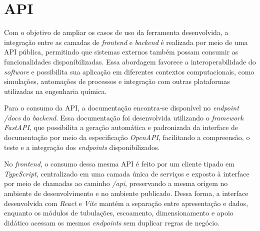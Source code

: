 \section{API}

Com o objetivo de ampliar os casos de uso da ferramenta desenvolvida, a integração entre as camadas de \textit{frontend} e \textit{backend} é realizada por meio de uma API pública, permitindo que sistemas externos também possam consumir as funcionalidades disponibilizadas. Essa abordagem favorece a interoperabilidade do \textit{software} e possibilita sua aplicação em diferentes contextos computacionais, como simulações, automações de processos e integração com outras plataformas utilizadas na engenharia química.

Para o consumo da API, a documentação encontra-se disponível no \textit{endpoint} \textit{/docs} do \textit{backend}. Essa documentação foi desenvolvida utilizando o \textit{framework} \textit{FastAPI}, que possibilita a geração automática e padronizada da interface de documentação por meio da especificação \textit{OpenAPI}, facilitando a compreensão, o teste e a integração dos \textit{endpoints} disponibilizados.

No \textit{frontend}, o consumo dessa mesma API é feito por um cliente tipado em \textit{TypeScript}, centralizado em uma camada única de serviços e exposto à interface por meio de chamadas ao caminho \textit{/api}, preservando a mesma origem no ambiente de desenvolvimento e no ambiente publicado. Dessa forma, a interface desenvolvida com \textit{React} e \textit{Vite} mantém a separação entre apresentação e dados, enquanto os módulos de tubulações, escoamento, dimensionamento e apoio didático acessam os mesmos \textit{endpoints} sem duplicar regras de negócio.
